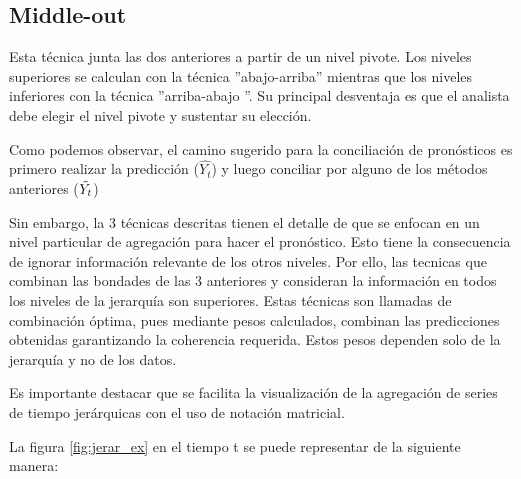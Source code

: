 \subsection{Middle-out}

Esta técnica junta las dos anteriores a partir de un nivel pivote. Los niveles superiores se calculan con la técnica ''abajo-arriba'' mientras que los niveles inferiores con la técnica ''arriba-abajo
''. Su principal desventaja es que el analista debe elegir el nivel pivote y sustentar su elección.

Como podemos observar, el camino sugerido para la conciliación de pronósticos es primero realizar la predicción ($\hat{Y_t}$) y luego conciliar por alguno de los métodos anteriores ($\Tilde{Y_t}$)

Sin embargo, la 3 técnicas descritas tienen el detalle de que se enfocan en un nivel particular de agregación para hacer el pronóstico. Esto tiene la consecuencia de ignorar información relevante de los otros niveles. Por ello, las tecnicas que combinan las bondades de las 3 anteriores y consideran la información en todos los niveles de la jerarquía son superiores. Estas técnicas son llamadas de combinación óptima, pues mediante pesos calculados, combinan las predicciones obtenidas garantizando la coherencia requerida. Estos pesos dependen solo de la jerarquía y no de los datos.

Es importante destacar que se facilita la visualización de la agregación de series de tiempo jerárquicas con el uso de notación matricial. 

La figura \ref{fig:jerar_ex} en el tiempo t se puede representar de la siguiente manera:

